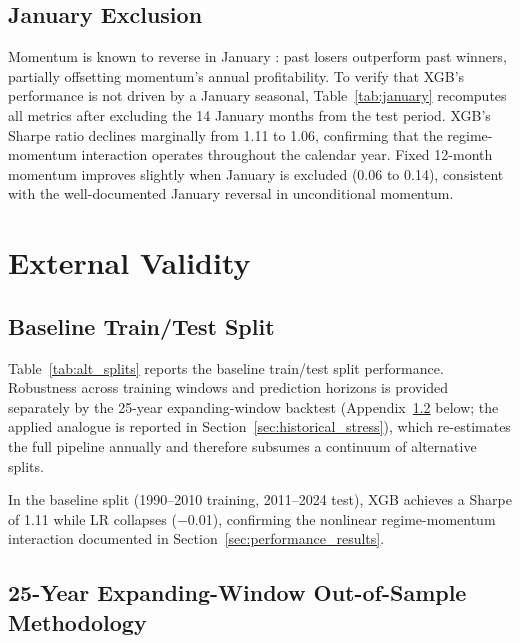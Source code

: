 \subsection{January Exclusion}\label{app:january}

Momentum is known to reverse in January \citep{JegadeeshTitman1993}: past losers outperform past winners, partially offsetting momentum's annual profitability. To verify that XGB's performance is not driven by a January seasonal, Table~\ref{tab:january} recomputes all metrics after excluding the 14 January months from the test period. XGB's Sharpe ratio declines marginally from 1.11 to 1.06, confirming that the regime-momentum interaction operates throughout the calendar year. Fixed 12-month momentum improves slightly when January is excluded (0.06 to 0.14), consistent with the well-documented January reversal in unconditional momentum.



\section{External Validity}\label{app:external_validity}

\subsection{Baseline Train/Test Split}\label{app:alt_splits}

Table~\ref{tab:alt_splits} reports the baseline train/test split performance. Robustness across training windows and prediction horizons is provided separately by the 25-year expanding-window backtest (Appendix~\ref{app:expanding_window} below; the applied analogue is reported in Section~\ref{sec:historical_stress}), which re-estimates the full pipeline annually and therefore subsumes a continuum of alternative splits.



In the baseline split (1990--2010 training, 2011--2024 test), XGB achieves a Sharpe of 1.11 while LR collapses ($-$0.01), confirming the nonlinear regime-momentum interaction documented in Section~\ref{sec:performance_results}.

\subsection{25-Year Expanding-Window Out-of-Sample Methodology}\label{app:expanding_window}

